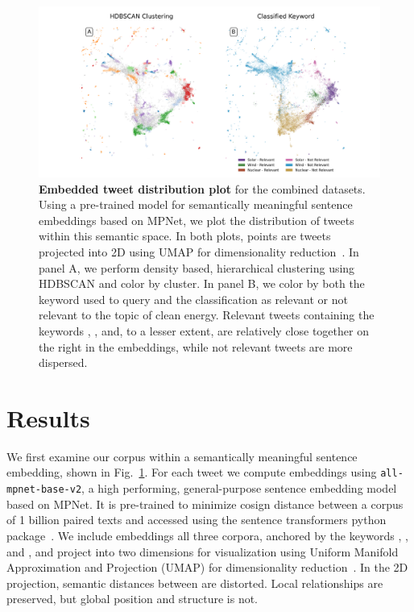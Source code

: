 \begin{figure}
  \centerfloat	
        \includegraphics[width=2.8\columnwidth]{figures/combined_labeled_embedding_horizontal.png} 
  \caption{\textbf{Embedded tweet distribution plot} for the combined datasets.
  Using a pre-trained model for semantically meaningful sentence embeddings based on MPNet, we plot the distribution of tweets within this semantic space.
  In both plots, points are tweets projected into 2D using UMAP for dimensionality reduction~\cite{mcinnes2018umap}.
  In panel A, we perform density based, hierarchical clustering using HDBSCAN and color by cluster.
  In panel B, we color by both the keyword used to query and the classification as relevant or not relevant to the topic of clean energy. 
  Relevant tweets containing the keywords , , and, to a lesser extent,  are relatively close together on the right in the embeddings, while not relevant tweets are more dispersed.} 
    \label{fig:combined_embeddings}
\end{figure}








\section{Results}
\label{sec:corpusCreation.results}

We first examine our corpus within a semantically meaningful sentence embedding, shown in Fig.~\ref{fig:combined_embeddings}. 
For each tweet
we compute embeddings using \texttt{all-mpnet-base-v2},
a high performing, general-purpose sentence embedding model based on MPNet. It is pre-trained to minimize cosign distance between a corpus of 1 billion paired texts and accessed using the sentence transformers python package~\cite{reimers-2019-sentence-bert}.
We include embeddings all three corpora, anchored by the keywords , , and , and project into two dimensions for visualization using Uniform Manifold Approximation and Projection (UMAP) for dimensionality reduction~\cite{mcinnes2018umap}. 
In the 2D projection, semantic distances between are distorted.
Local relationships are preserved, but global position and structure is not. 

